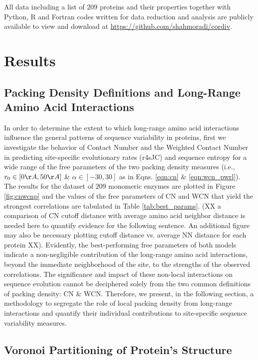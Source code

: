 \documentclass[11pt]{article}
\begin{document}
    All data including a list of $209$ proteins and their properties together with Python, R and Fortran codes written for data reduction and analysis are publicly available to view and download at \url{https://github.com/shahmoradi/cordiv}.


\section{Results}

    \subsection*{Packing Density Definitions and Long-Range Amino Acid Interactions}
    \label{sec:cnwcn}

    In order to determine the extent to which long-range amino acid interactions influence the general patterns of sequence variability in proteins, first we investigate the behavior of Contact Number and the Weighted Contact Number in predicting site-specific evolutionary rates (r4sJC) and sequence entropy for a wide range of the free parameters of the two packing density measures (i.e., $r_0\in[0\AA,50\AA]$ \& $\alpha\in[-30,30]$ as in Eqns. \ref{eqn:cn} \& \ref{eqn:wcn_pwrl}). \\

    The results for the dataset of $209$ monomeric enzymes are plotted in Figure \ref{fig:cnwcnp} and the values of the free parameters of CN and WCN that yield the strongest correlations are tabulated in Table \ref{tab:best_params}. (XX a comparison of CN cutoff distance with average amino acid neighbor distance is needed here to quantify evidence for the following sentence. An additional figure may also be necessary plotting cutoff distance vs. average NN distance for each protein XX). Evidently, the best-performing free parameters of both models indicate a non-negligible contribution of the long-range amino acid interactions, beyond the immediate neighborhood of the site, to the strengths of the observed correlations. The significance and impact of these non-local interactions on sequence evolution cannot be deciphered solely from the two common definitions of packing density: CN \& WCN. Therefore, we present, in the following section, a methodology to segregate the role of local packing density from long-range interactions and quantify their individual contributions to site-specific sequence variability measures.

    \subsection*{Voronoi Partitioning of Protein's Structure}
    \label{sec:voro}
\end{document}
